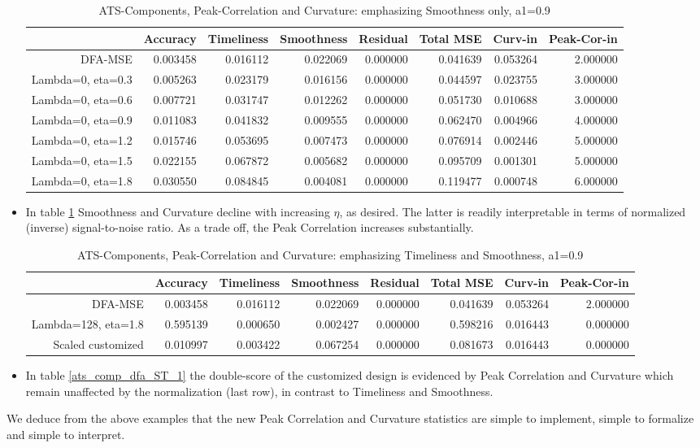 \documentclass[a4paper]{book}
\begin{document}
\begin{itemize}
\begin{table}[ht]
\centering
\begin{tabular}{rrrrrrrr}
  \hline
 & Accuracy & Timeliness & Smoothness & Residual & Total MSE & Curv-in & Peak-Cor-in \\ 
  \hline
DFA-MSE & 0.003458 & 0.016112 & 0.022069 & 0.000000 & 0.041639 & 0.053264 & 2.000000 \\ 
  Lambda=0, eta=0.3 & 0.005263 & 0.023179 & 0.016156 & 0.000000 & 0.044597 & 0.023755 & 3.000000 \\ 
  Lambda=0, eta=0.6 & 0.007721 & 0.031747 & 0.012262 & 0.000000 & 0.051730 & 0.010688 & 3.000000 \\ 
  Lambda=0, eta=0.9 & 0.011083 & 0.041832 & 0.009555 & 0.000000 & 0.062470 & 0.004966 & 4.000000 \\ 
  Lambda=0, eta=1.2 & 0.015746 & 0.053695 & 0.007473 & 0.000000 & 0.076914 & 0.002446 & 5.000000 \\ 
  Lambda=0, eta=1.5 & 0.022155 & 0.067872 & 0.005682 & 0.000000 & 0.095709 & 0.001301 & 5.000000 \\ 
  Lambda=0, eta=1.8 & 0.030550 & 0.084845 & 0.004081 & 0.000000 & 0.119477 & 0.000748 & 6.000000 \\ 
   \hline
\end{tabular}
\caption{ATS-Components, Peak-Correlation and Curvature: emphasizing Smoothness only, a1=0.9} 
\label{ats_comp_dfa_S_1_pc}
\end{table}\item In table \ref{ats_comp_dfa_S_1_pc} Smoothness and Curvature decline with increasing $\eta$, as desired. The latter is readily interpretable in terms of normalized (inverse) signal-to-noise ratio. As a trade off, the Peak Correlation increases substantially. 
\begin{table}[ht]
\centering
\begin{tabular}{rrrrrrrr}
  \hline
 & Accuracy & Timeliness & Smoothness & Residual & Total MSE & Curv-in & Peak-Cor-in \\ 
  \hline
DFA-MSE & 0.003458 & 0.016112 & 0.022069 & 0.000000 & 0.041639 & 0.053264 & 2.000000 \\ 
  Lambda=128, eta=1.8 & 0.595139 & 0.000650 & 0.002427 & 0.000000 & 0.598216 & 0.016443 & 0.000000 \\ 
  Scaled customized & 0.010997 & 0.003422 & 0.067254 & 0.000000 & 0.081673 & 0.016443 & 0.000000 \\ 
   \hline
\end{tabular}
\caption{ATS-Components, Peak-Correlation and Curvature: emphasizing Timeliness and Smoothness, a1=0.9} 
\label{ats_comp_dfa_ST_1_pc}
\end{table}\item In table \ref{ats_comp_dfa_ST_1} the double-score of the customized design is evidenced by Peak Correlation and Curvature which remain unaffected by the normalization (last row), in contrast to Timeliness and Smoothness.      
\end{itemize}
We deduce from the above examples that the new Peak Correlation and Curvature statistics are simple to implement, simple to formalize and simple to interpret.
\end{document}
